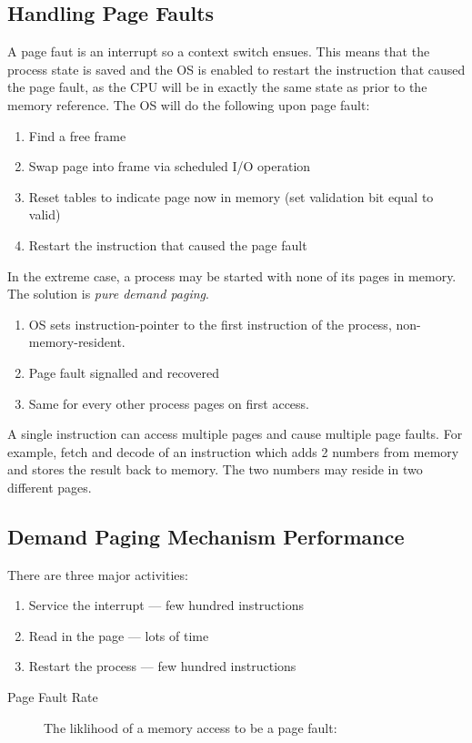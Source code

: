 \documentclass[11pt]{article}
\begin{document}
\subsection{Handling Page Faults}
\label{sec:orgadd5f8d}
A page faut is an interrupt so a context switch ensues.
This means that the process state is saved and the OS is enabled to restart the instruction that caused the page fault, as the CPU will be in exactly the same state as prior to the memory reference.
The OS will do the following upon page fault:
\begin{enumerate}
\item Find a free frame
\item Swap page into frame via scheduled I/O operation
\item Reset tables to indicate page now in memory (set validation bit equal to valid)
\item Restart the instruction that caused the page fault
\end{enumerate}
In the extreme case, a process may be started with none of its pages in memory.
The solution is \emph{pure demand paging}.
\begin{enumerate}
\item OS sets instruction-pointer to the first instruction of the process, non-memory-resident.
\item Page fault signalled and recovered
\item Same for every other process pages on first access.
\end{enumerate}
A single instruction can access multiple pages and cause multiple page faults.
For example, fetch and decode of an instruction which adds 2 numbers from memory and stores the result back to memory.
The two numbers may reside in two different pages.
\subsection{Demand Paging Mechanism Performance}
\label{sec:org7e209f6}
There are three major activities:
\begin{enumerate}
\item Service the interrupt --- few hundred instructions
\item Read in the page --- lots of time
\item Restart the process --- few hundred instructions
\end{enumerate}


\begin{description}
\item[{Page Fault Rate}] The liklihood of a memory access to be a page fault:
\end{description}
\end{document}
